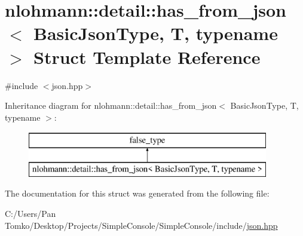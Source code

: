 \hypertarget{structnlohmann_1_1detail_1_1has__from__json}{}\section{nlohmann\+::detail\+::has\+\_\+from\+\_\+json$<$ Basic\+Json\+Type, T, typename $>$ Struct Template Reference}
\label{structnlohmann_1_1detail_1_1has__from__json}


{\ttfamily \#include $<$json.\+hpp$>$}

Inheritance diagram for nlohmann\+::detail\+::has\+\_\+from\+\_\+json$<$ Basic\+Json\+Type, T, typename $>$\+:\begin{figure}[H]
\begin{center}
\leavevmode
\includegraphics[height=2.000000cm]{dc/dac/structnlohmann_1_1detail_1_1has__from__json}
\end{center}
\end{figure}


The documentation for this struct was generated from the following file\+:\begin{DoxyCompactItemize}
\item 
C\+:/\+Users/\+Pan Tomko/\+Desktop/\+Projects/\+Simple\+Console/\+Simple\+Console/include/\mbox{\hyperlink{json_8hpp}{json.\+hpp}}\end{DoxyCompactItemize}
